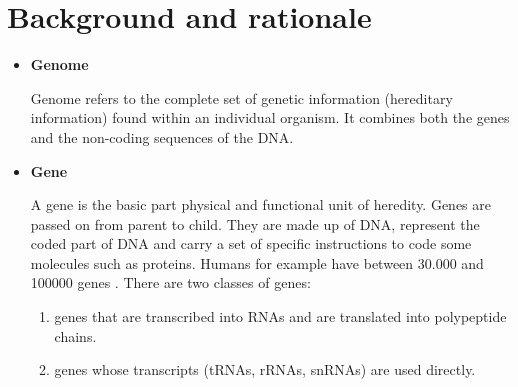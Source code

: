 \documentclass[10pt,twocolumn,letterpaper]{article}
\begin{document}
\section{Background and rationale}
 {
   \begin{itemize}
      \item \textbf{Genome}
      \par Genome refers to the complete set of genetic information (hereditary information) found within an individual organism.
       \cite{krawetz2003introduction} It combines   both the genes and the non-coding sequences of the DNA.

      \item \textbf{Gene} 
      \par A gene is the basic part physical and functional unit of heredity. Genes are passed on from parent to child. They     are made up of DNA, represent the coded part of DNA and carry a set of specific instructions to code some molecules such as proteins. Humans for example have between 30.000 and 100000 genes \cite{krawetz2003introduction}. There are two classes of genes:
      \begin{enumerate}
          \item genes that are transcribed into RNAs and are translated into polypeptide chains.
          \item genes whose transcripts (tRNAs, rRNAs, snRNAs) are used directly.
      \end{enumerate}


\end{itemize}}
\end{document}
